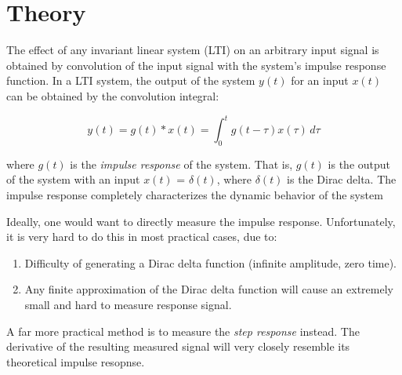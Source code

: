 \section{Theory}

The effect of any invariant linear system (LTI) on an arbitrary input  signal is
obtained by convolution of the input signal  with  the system's impulse response
function. In a LTI system, the  output  of the system $y(t)$ for an input $x(t)$
can be obtained by the convolution integral:

\begin{equation}
    y(t)=g(t)*x(t)=\int_0^t g(t-\tau)x(\tau)\,d\tau
\end{equation}

where $g(t)$ is the \textit{impulse response}  of the system. That is, $g(t)$ is
the output of the system with an input $x(t)$ = $\delta(t)$,  where  $\delta(t)$
is the Dirac delta. The impulse response completely  characterizes  the  dynamic
behavior of the system

Ideally, one would want to directly measure the impulse response. Unfortunately,
it is very hard to do this in most practical cases, due to:

\begin{enumerate}
    \item Difficulty of generating a Dirac delta function (infinite amplitude, zero time).
    \item Any finite approximation of the Dirac delta function will cause an extremely small and hard to measure response signal.
\end{enumerate}

A far more practical method is  to  measure  the \textit{step response} instead.
The derivative of the resulting measured signal will  very  closely resemble its
theoretical impulse resopnse.





